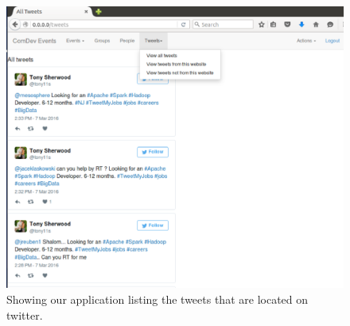 \documentclass[draftclsnofoot,10pt,onecolumn]{IEEEtran} %
\begin{document}
\begin{figure}[H]
  \begin{center}
  
  \includegraphics[width=5in, frame]{listingTweets}
  \captionsetup{width=.4\linewidth}
  \centering
  \caption{Showing our application listing the tweets that are located on twitter. }

  \end{center}
\end{figure}
\end{document}
